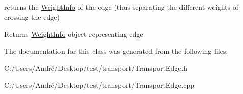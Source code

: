 returns the \hyperlink{class_weight_info}{Weight\+Info} of the edge (thus separating the different weights of crossing the edge) 

\begin{DoxyReturn}{Returns}
\hyperlink{class_weight_info}{Weight\+Info} object representing edge 
\end{DoxyReturn}


The documentation for this class was generated from the following files\+:\begin{DoxyCompactItemize}
\item 
C\+:/\+Users/\+André/\+Desktop/test/transport/Transport\+Edge.\+h\item 
C\+:/\+Users/\+André/\+Desktop/test/transport/Transport\+Edge.\+cpp\end{DoxyCompactItemize}
